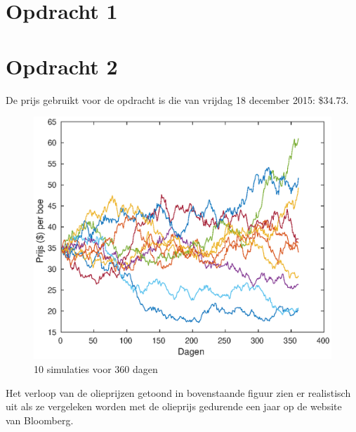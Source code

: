 \documentclass[11pt,a4paper]{article}
\begin{document}
\begin{titlepage}

\vfill %

\end{titlepage}

\section*{Opdracht 1}



\section*{Opdracht 2}
De prijs gebruikt voor de opdracht is die van vrijdag 18 december 2015: \$$34.73$.

\begin{figure}[H]
\centering
\includegraphics[scale=0.75]{opdracht2}
\caption{10 simulaties voor 360 dagen}
\end{figure}

\noindent
Het verloop van de olieprijzen getoond in bovenstaande figuur zien er realistisch uit als ze vergeleken worden met de olieprijs gedurende een jaar op de website van Bloomberg.



\
\end{document}
